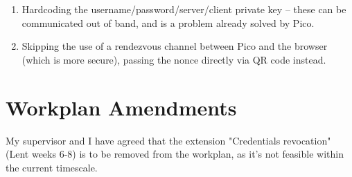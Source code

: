 \documentclass[12pt,a4paper,twoside]{article}
\begin{document}
\begin{enumerate}

\item Hardcoding the username/password/server/client private key – these can be communicated out of band, and is a problem already solved by Pico.

\item Skipping the use of a rendezvous channel between Pico and the browser (which is more secure), passing the nonce directly via QR code instead.

\end{enumerate}

\section*{Workplan Amendments}

My supervisor and I have agreed that the extension "Credentials revocation" (Lent weeks 6-8) is to be removed from the workplan, as it's not feasible within the current timescale.
\end{document}
